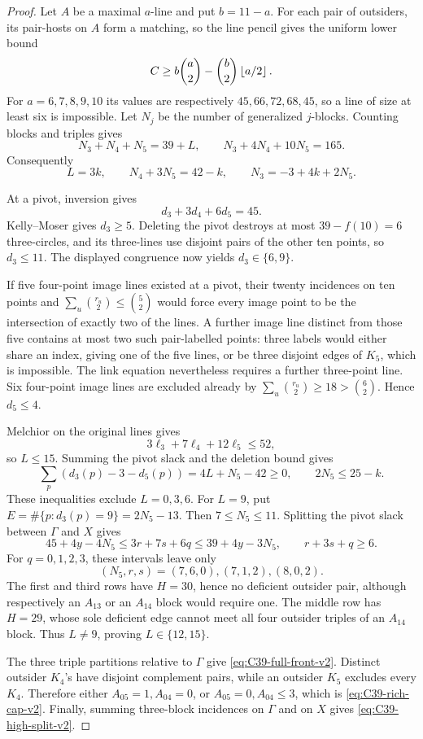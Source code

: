 \begin{proof}
Let \(A\) be a maximal \(a\)-line and put \(b=11-a\).  For each pair of
outsiders, its pair-hosts on \(A\) form a matching, so the line pencil gives
the uniform lower bound
\[
 C\ge b\binom a2-\binom b2\left\lfloor a/2\right\rfloor.
\]
For \(a=6,7,8,9,10\) its values are respectively
\(45,66,72,68,45\), so a line of size at least six is impossible.  Let
\(N_j\) be the number of generalized \(j\)-blocks.  Counting blocks and
triples gives
\[
 N_3+N_4+N_5=39+L,\qquad N_3+4N_4+10N_5=165.
\]
Consequently
\begin{equation}\label{eq:C39-global-blocks-v2}
 L=3k,\qquad N_4+3N_5=42-k,\qquad
 N_3=-3+4k+2N_5.
\end{equation}

At a pivot, inversion gives
\[
 d_3+3d_4+6d_5=45.
\]
Kelly--Moser gives \(d_3\ge5\).  Deleting the pivot destroys at most
\(39-f(10)=6\) three-circles, and its three-lines use disjoint pairs of the
other ten points, so \(d_3\le11\).  The displayed congruence now yields
\(d_3\in\{6,9\}\).

If five four-point image lines existed at a pivot, their twenty incidences
on ten points and
\(\sum_u\binom{r_u}{2}\le\binom52\) would force every image point to be
the intersection of exactly two of the lines.  A further image line distinct
from those five contains at most two such pair-labelled points: three labels
would either share an index, giving one of the five lines, or be three
disjoint edges of \(K_5\), which is impossible.  The link equation nevertheless
requires a further three-point line.  Six four-point image lines are excluded
already by \(\sum_u\binom{r_u}{2}\ge18>\binom62\).  Hence \(d_5\le4\).

Melchior on the original lines gives
\[
 3\ell_3+7\ell_4+12\ell_5\le52,
\]
so \(L\le15\).  Summing the pivot slack and the deletion bound gives
\[
 \sum_p(d_3(p)-3-d_5(p))=4L+N_5-42\ge0,
 \qquad 2N_5\le25-k.
\]
These inequalities exclude \(L=0,3,6\).  For \(L=9\), put
\(E=\#\{p:d_3(p)=9\}=2N_5-13\).  Then \(7\le N_5\le11\).
Splitting the pivot slack between \(\Gamma\) and \(X\) gives
\[
 45+4y-4N_5\le3r+7s+6q\le39+4y-3N_5,
 \qquad r+3s+q\ge6.
\]
For \(q=0,1,2,3\), these intervals leave only
\[
 (N_5,r,s)=(7,6,0),(7,1,2),(8,0,2).
\]
The first and third rows have \(H=30\), hence no deficient outsider pair,
although respectively an \(A_{13}\) or an \(A_{14}\) block would require
one.  The middle row has \(H=29\), whose sole deficient edge cannot meet all
four outsider triples of an \(A_{14}\) block.  Thus \(L\ne9\), proving
\(L\in\{12,15\}\).

The three triple partitions relative to \(\Gamma\) give
\eqref{eq:C39-full-front-v2}.  Distinct outsider \(K_4\)'s have disjoint
complement pairs, while an outsider \(K_5\) excludes every \(K_4\).
Therefore either \(A_{05}=1,A_{04}=0\), or \(A_{05}=0,A_{04}\le3\), which
is \eqref{eq:C39-rich-cap-v2}.  Finally, summing three-block incidences on
\(\Gamma\) and on \(X\) gives \eqref{eq:C39-high-split-v2}.
\end{proof}

